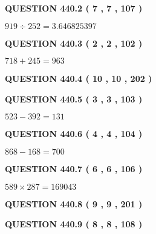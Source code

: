 \documentclass{ctexart}
\begin{document}
{\textbf{\Large{QUESTION
440.2 
 ( 7 , 7 , 107 )
}}}
  
  
 
 

$ %
919 \div  %
252=   %
3.646825397$
 
 
  
\vspace{0.2in}
  
{\textbf{\Large{QUESTION
440.3 
 ( 2 , 2 , 102 )
}}}
  
  
 
 

$ %
718 +  %
245=   %
963$
 
 
  
\vspace{0.2in}
  
{\textbf{\Large{QUESTION
440.4 
 ( 10 , 10 , 202 )
}}}
  
  
  
\vspace{0.2in}
  
{\textbf{\Large{QUESTION
440.5 
 ( 3 , 3 , 103 )
}}}
  
  
 
 

$ %
523 -  %
392=   %
131$
 
 
  
\vspace{0.2in}
  
{\textbf{\Large{QUESTION
440.6 
 ( 4 , 4 , 104 )
}}}
  
  
 
 

$ %
868 -  %
168=   %
700$
 
 
  
\vspace{0.2in}
  
{\textbf{\Large{QUESTION
440.7 
 ( 6 , 6 , 106 )
}}}
  
  
 
 

$ %
589 \times  %
287=   %
169043$
 
 
  
\vspace{0.2in}
  
{\textbf{\Large{QUESTION
440.8 
 ( 9 , 9 , 201 )
}}}
  
  
  
\vspace{0.2in}
  
{\textbf{\Large{QUESTION
440.9 
 ( 8 , 8 , 108 )
}}}
  
  
 
\end{document}
